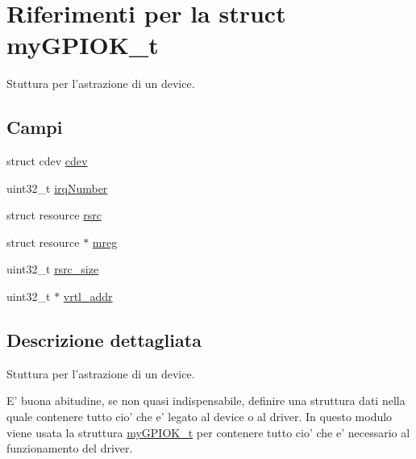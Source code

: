 \hypertarget{structmy_g_p_i_o_k__t}{\section{Riferimenti per la struct my\+G\+P\+I\+O\+K\+\_\+t}
\label{structmy_g_p_i_o_k__t}
}


Stuttura per l'astrazione di un device.  


\subsection*{Campi}
\begin{DoxyCompactItemize}
\item 
struct cdev \hyperlink{structmy_g_p_i_o_k__t_acba682fe45d5a1501790dbdb1d99bd6a}{cdev}
\item 
uint32\+\_\+t \hyperlink{structmy_g_p_i_o_k__t_a42a1593ebe61611c4e29413903a373a5}{irq\+Number}
\item 
struct resource \hyperlink{structmy_g_p_i_o_k__t_a565a1848c3ae8026257a74cf169c6941}{rsrc}
\item 
struct resource $\ast$ \hyperlink{structmy_g_p_i_o_k__t_a18c4eb95350c67ccb239a8a39c43c09a}{mreg}
\item 
uint32\+\_\+t \hyperlink{structmy_g_p_i_o_k__t_a0f87b53dc5049a349ef01aa586c0b5dc}{rsrc\+\_\+size}
\item 
uint32\+\_\+t $\ast$ \hyperlink{structmy_g_p_i_o_k__t_a7fb037ce37d63eb2c327ec952c74d2e9}{vrtl\+\_\+addr}
\end{DoxyCompactItemize}


\subsection{Descrizione dettagliata}
Stuttura per l'astrazione di un device. 

E' buona abitudine, se non quasi indispensabile, definire una struttura dati nella quale contenere tutto cio' che e' legato al device o al driver. In questo modulo viene usata la struttura \hyperlink{structmy_g_p_i_o_k__t}{my\+G\+P\+I\+O\+K\+\_\+t} per contenere tutto cio' che e' necessario al funzionamento del driver. 

